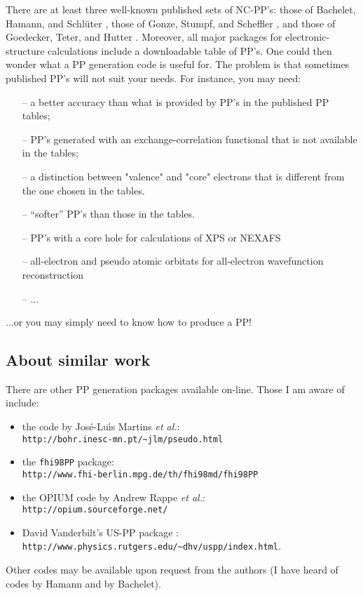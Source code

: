 There are at least three well-known published sets of NC-PP's:
those of Bachelet, Hamann, and Schl\"uter \cite{BHS},
those of Gonze, Stumpf, and Scheffler \cite{Gonze}, and
those of Goedecker, Teter, and Hutter \cite{Goedecker}. 
Moreover, all major packages for electronic-structure calculations
include a downloadable table of PP's. One could then wonder 
what a PP generation code is useful for. The problem is that 
sometimes published PP's will not suit your needs. For instance,
you may need:
\begin{enumerate}
 \item[--] a better accuracy than what is provided 
     by PP's in the published PP tables;
 \item[--] PP's generated with an exchange-correlation
     functional that is not available in the tables;
 \item[--] a distinction between "valence" and "core"
     electrons that is different from the one chosen in the tables.
 \item[--] ``softer'' PP's than those in the tables.
 \item[--] PP's with a core hole for calculations of
     XPS or NEXAFS
 \item[--] all-electron and pseudo atomic orbitats for
     all-electron wavefunction reconstruction
 \item[--] ...
\end{enumerate}
...or you may simply need to know how to produce a PP!

\subsection{About similar work}

There are other PP generation packages available on-line.
Those I am aware of include:
\begin{itemize}
\item the code by Jos\'e-Lu{\'\i}s Martins {\em et al.}\cite{TM}:\\
{\tt http://bohr.inesc-mn.pt/\~{}jlm/pseudo.html}
\item the {\tt fhi98PP} package\cite{fhi98PP}:\\
{\tt http://www.fhi-berlin.mpg.de/th/fhi98md/fhi98PP}
\item the OPIUM code by Andrew Rappe {\em et al.}\cite{RRKJ}:\\
{\tt http://opium.sourceforge.net/}
\item David Vanderbilt's US-PP package \cite{van}:\\
{\tt http://www.physics.rutgers.edu/\~{}dhv/uspp/index.html}.
\end{itemize}
Other codes may be available upon request from the authors 
(I have heard of codes by Hamann and by Bachelet).

